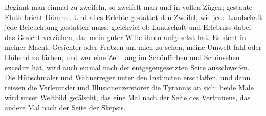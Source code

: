 Beginnt man einmal zu zweifeln, so zweifelt man  und in vollen Zügen; gestaute Fluth bricht Dämme. Und alles Erlebte gestattet den Zweifel, wie jede Landschaft jede Beleuchtung gestatten muss, gleichviel ob Landschaft und Erlebniss dabei das Gesicht verziehen, das mein guter Wille ihnen aufgesetzt hat. Es steht in meiner Macht, Gesichter oder Fratzen um mich zu sehen, meine Umwelt fahl oder blühend zu färben; und wer eine Zeit lang im Schönfärben und Schönsehen excedirt hat, wird auch einmal nach der entgegengesetzten Seite ausschweifen. Die Hübschmaler und Wahnerreger unter den Instincten erschlaffen, und dann reissen die Verleumder und Illusionenzerstörer die Tyrannis an sich; beide Male wird unser Weltbild gefälscht, das eine Mal nach der Seite des Vertrauens, das andere Mal nach der Seite der Skepsis.
\par

